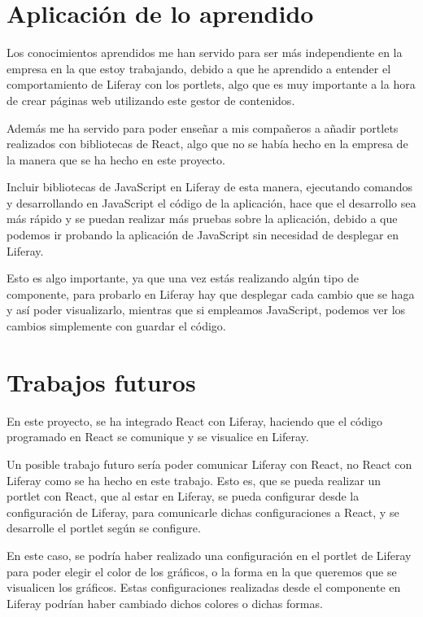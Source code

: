 \documentclass[a4paper, 12pt]{book}
\begin{document}
\section{Aplicación de lo aprendido}
\label{sec:aprendido}
Los conocimientos aprendidos me han servido para ser más independiente en la empresa en la que estoy trabajando, debido a que he aprendido a entender el comportamiento de Liferay con los portlets, algo que es muy importante a la hora de crear páginas web utilizando este gestor de contenidos.

\vspace{5mm}
Además me ha servido para poder enseñar a mis compañeros a añadir portlets realizados con bibliotecas de React, algo que no se había hecho en la empresa de la manera que se ha hecho en este proyecto. 

Incluir bibliotecas de JavaScript en Liferay de esta manera, ejecutando comandos y desarrollando en JavaScript el código de la aplicación, hace que el desarrollo sea más rápido y se puedan realizar más pruebas sobre la aplicación, debido a que podemos ir probando la aplicación de JavaScript sin necesidad de desplegar en Liferay.

Esto es algo importante, ya que una vez estás realizando algún tipo de componente, para probarlo en Liferay hay que desplegar cada cambio que se haga y así poder visualizarlo, mientras que si empleamos JavaScript, podemos ver los cambios simplemente con guardar el código.

 
\section{Trabajos futuros}
\label{sec:trabajos_futuros}
En este proyecto, se ha integrado React con Liferay, haciendo que el código programado en React se comunique y se visualice en Liferay.

Un posible trabajo futuro sería poder comunicar Liferay con React, no React con Liferay como se ha hecho en este trabajo. Esto es, que se pueda realizar un portlet con React, que al estar en Liferay, se pueda configurar desde la configuración de Liferay, para comunicarle dichas configuraciones a React, y se desarrolle el portlet según se configure.

En este caso, se podría haber realizado una configuración en el portlet de Liferay para poder elegir el color de los gráficos, o la forma en la que queremos que se visualicen los gráficos. Estas configuraciones realizadas desde el componente en Liferay podrían haber cambiado dichos colores o dichas formas.
\end{document}
